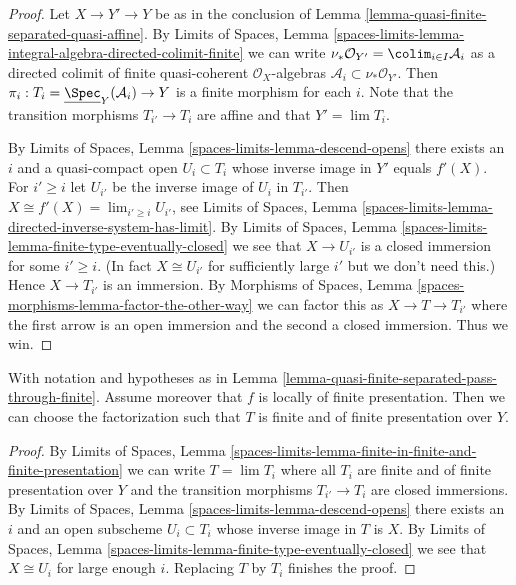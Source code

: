 \begin{proof}
Let $X \to Y' \to Y$ be as in the conclusion of
Lemma \ref{lemma-quasi-finite-separated-quasi-affine}.
By
Limits of Spaces, Lemma
\ref{spaces-limits-lemma-integral-algebra-directed-colimit-finite}
we can write
$\nu_*\mathcal{O}_{Y'} = \colim_{i \in I} \mathcal{A}_i$ as a
directed colimit of finite quasi-coherent $\mathcal{O}_X$-algebras
$\mathcal{A}_i \subset \nu_*\mathcal{O}_{Y'}$. Then
$\pi_i : T_i = \underline{\Spec}_Y(\mathcal{A}_i) \to Y$
is a finite morphism for each $i$.
Note that the transition morphisms $T_{i'} \to T_i$ are affine
and that $Y' = \lim T_i$.

\medskip\noindent
By Limits of Spaces, Lemma \ref{spaces-limits-lemma-descend-opens}
there exists an $i$ and a quasi-compact open
$U_i \subset T_i$ whose inverse image in $Y'$ equals
$f'(X)$. For $i' \geq i$ let $U_{i'}$ be the inverse image
of $U_i$ in $T_{i'}$. Then $X \cong f'(X) = \lim_{i' \geq i} U_{i'}$, see
Limits of Spaces, Lemma
\ref{spaces-limits-lemma-directed-inverse-system-has-limit}.
By
Limits of Spaces, Lemma
\ref{spaces-limits-lemma-finite-type-eventually-closed} we see that
$X \to U_{i'}$ is a closed immersion for some $i' \geq i$.
(In fact $X \cong U_{i'}$ for sufficiently
large $i'$ but we don't need this.) Hence $X \to T_{i'}$ is an immersion. By
Morphisms of Spaces, Lemma
\ref{spaces-morphisms-lemma-factor-the-other-way}
we can factor this as $X \to T \to T_{i'}$ where the first arrow
is an open immersion and the second a closed immersion. Thus we win.
\end{proof}

\begin{lemma}
\label{lemma-quasi-finite-separated-pass-through-finite-addendum}
With notation and hypotheses as in
Lemma \ref{lemma-quasi-finite-separated-pass-through-finite}.
Assume moreover that $f$ is locally of finite presentation. Then we can
choose the factorization such that $T$ is finite and of
finite presentation over $Y$.
\end{lemma}

\begin{proof}
By Limits of Spaces, Lemma
\ref{spaces-limits-lemma-finite-in-finite-and-finite-presentation} we can write
$T = \lim T_i$ where all $T_i$ are finite and of finite presentation
over $Y$ and the transition morphisms $T_{i'} \to T_i$ are closed
immersions. By
Limits of Spaces, Lemma \ref{spaces-limits-lemma-descend-opens}
there exists an $i$ and an open subscheme $U_i \subset T_i$ whose inverse
image in $T$ is $X$. By
Limits of Spaces, Lemma
\ref{spaces-limits-lemma-finite-type-eventually-closed}
we see that $X \cong U_i$ for large enough $i$.
Replacing $T$ by $T_i$ finishes the proof.
\end{proof}


